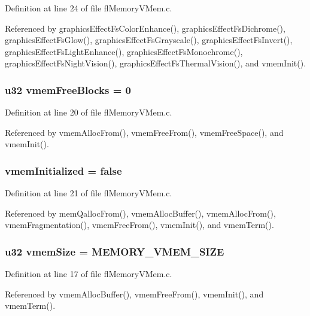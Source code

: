 Definition at line 24 of file fl\-Memory\-VMem.c.

Referenced by graphics\-Effect\-Fs\-Color\-Enhance(), graphics\-Effect\-Fs\-Dichrome(), graphics\-Effect\-Fs\-Glow(), graphics\-Effect\-Fs\-Grayscale(), graphics\-Effect\-Fs\-Invert(), graphics\-Effect\-Fs\-Light\-Enhance(), graphics\-Effect\-Fs\-Monochrome(), graphics\-Effect\-Fs\-Night\-Vision(), graphics\-Effect\-Fs\-Thermal\-Vision(), and vmem\-Init().
\subsubsection{\setlength{\rightskip}{0pt plus 5cm}u32 {\bf vmem\-Free\-Blocks} = 0}\label{flMemoryVMem_8c_ca271688574e8c57b674a9db91d23e42}




Definition at line 20 of file fl\-Memory\-VMem.c.

Referenced by vmem\-Alloc\-From(), vmem\-Free\-From(), vmem\-Free\-Space(), and vmem\-Init().
\subsubsection{ {\bf vmem\-Initialized} = false}\label{flMemoryVMem_8c_f7488958314b830b42be236096a8550c}




Definition at line 21 of file fl\-Memory\-VMem.c.

Referenced by mem\-Qalloc\-From(), vmem\-Alloc\-Buffer(), vmem\-Alloc\-From(), vmem\-Fragmentation(), vmem\-Free\-From(), vmem\-Init(), and vmem\-Term().
\subsubsection{\setlength{\rightskip}{0pt plus 5cm}u32 {\bf vmem\-Size} = MEMORY\_\-VMEM\_\-SIZE}\label{flMemoryVMem_8c_5bdb4a91bd69dda7958d392b8a318405}




Definition at line 17 of file fl\-Memory\-VMem.c.

Referenced by vmem\-Alloc\-Buffer(), vmem\-Free\-From(), vmem\-Init(), and vmem\-Term().
